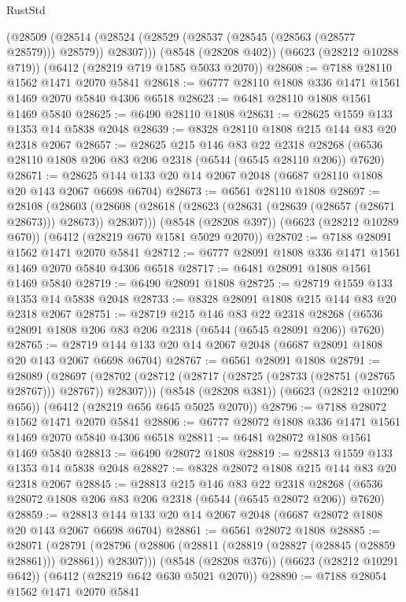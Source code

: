 \begin{lexlean}{RustStd}
\begin{coremodule}
    (@28509 (@28514 (@28524 (@28529 (@28537 (@28545 (@28563 (@28577 @28579))) @28579)) @28307)))
    (@8548 (@28208 @402))
    (@6623 (@28212 @10288 @719))
    (@6412 (@28219 @719 @1585 @5033 @2070))
@28608 := @7188 @28110 @1562 @1471 @2070 @5841
@28618 := @6777 @28110 @1808 @336 @1471 @1561 @1469 @2070 @5840 @4306 @6518
@28623 := @6481 @28110 @1808 @1561 @1469 @5840
@28625 := @6490 @28110 @1808
@28631 := @28625 @1559 @133 @1353 @14 @5838 @2048
@28639 := @8328 @28110 @1808 @215 @144 @83 @20 @2318 @2067
@28657 := @28625
    @215
    @146
    @83
    @22
    @2318
    @28268
    (@6536 @28110 @1808 @206 @83 @206 @2318 (@6544 (@6545 @28110 @206)) @7620)
@28671 := @28625 @144 @133 @20 @14 @2067 @2048 (@6687 @28110 @1808 @20 @143 @2067 @6698 @6704)
@28673 := @6561 @28110 @1808
@28697 := @28108
    (@28603 (@28608 (@28618 (@28623 (@28631 (@28639 (@28657 (@28671 @28673))) @28673)) @28307)))
    (@8548 (@28208 @397))
    (@6623 (@28212 @10289 @670))
    (@6412 (@28219 @670 @1581 @5029 @2070))
@28702 := @7188 @28091 @1562 @1471 @2070 @5841
@28712 := @6777 @28091 @1808 @336 @1471 @1561 @1469 @2070 @5840 @4306 @6518
@28717 := @6481 @28091 @1808 @1561 @1469 @5840
@28719 := @6490 @28091 @1808
@28725 := @28719 @1559 @133 @1353 @14 @5838 @2048
@28733 := @8328 @28091 @1808 @215 @144 @83 @20 @2318 @2067
@28751 := @28719
    @215
    @146
    @83
    @22
    @2318
    @28268
    (@6536 @28091 @1808 @206 @83 @206 @2318 (@6544 (@6545 @28091 @206)) @7620)
@28765 := @28719 @144 @133 @20 @14 @2067 @2048 (@6687 @28091 @1808 @20 @143 @2067 @6698 @6704)
@28767 := @6561 @28091 @1808
@28791 := @28089
    (@28697 (@28702 (@28712 (@28717 (@28725 (@28733 (@28751 (@28765 @28767))) @28767)) @28307)))
    (@8548 (@28208 @381))
    (@6623 (@28212 @10290 @656))
    (@6412 (@28219 @656 @645 @5025 @2070))
@28796 := @7188 @28072 @1562 @1471 @2070 @5841
@28806 := @6777 @28072 @1808 @336 @1471 @1561 @1469 @2070 @5840 @4306 @6518
@28811 := @6481 @28072 @1808 @1561 @1469 @5840
@28813 := @6490 @28072 @1808
@28819 := @28813 @1559 @133 @1353 @14 @5838 @2048
@28827 := @8328 @28072 @1808 @215 @144 @83 @20 @2318 @2067
@28845 := @28813
    @215
    @146
    @83
    @22
    @2318
    @28268
    (@6536 @28072 @1808 @206 @83 @206 @2318 (@6544 (@6545 @28072 @206)) @7620)
@28859 := @28813 @144 @133 @20 @14 @2067 @2048 (@6687 @28072 @1808 @20 @143 @2067 @6698 @6704)
@28861 := @6561 @28072 @1808
@28885 := @28071
    (@28791 (@28796 (@28806 (@28811 (@28819 (@28827 (@28845 (@28859 @28861))) @28861)) @28307)))
    (@8548 (@28208 @376))
    (@6623 (@28212 @10291 @642))
    (@6412 (@28219 @642 @630 @5021 @2070))
@28890 := @7188 @28054 @1562 @1471 @2070 @5841

\end{coremodule}
\end{lexlean}
